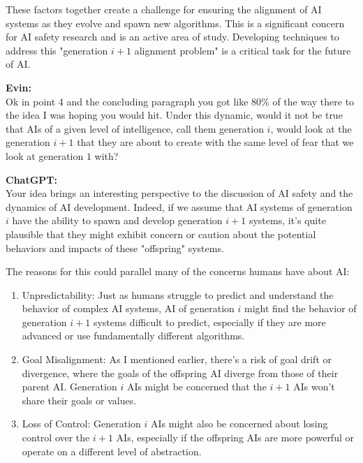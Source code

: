 \documentclass{article}[10pt]
\begin{document}
    These factors together create a challenge for ensuring the alignment of AI systems as they evolve and spawn new algorithms. 
    This is a significant concern for AI safety research and is an active area of study. 
    Developing techniques to address this "generation \(i + 1\) alignment problem" is a critical task for the future of AI.\par


\noindent \textbf{Evin:}\\
Ok in point 4 and the concluding paragraph you got like 80\% of the way there to the idea I was hoping you would hit. 
Under this dynamic, would it not be true that AIs of a given level of intelligence, call them generation $ i $, would look at the generation $ i + 1$ that they are about to create with the same level of fear that we look at generation $1$ with?\par


\noindent \textbf{ChatGPT:}\\
Your idea brings an interesting perspective to the discussion of AI safety and the dynamics of AI development. 
Indeed, if we assume that AI systems of generation \(i\) have the ability to spawn and develop generation \(i+1\) systems, it's quite plausible that they might exhibit concern or caution about the potential behaviors and impacts of these "offspring" systems.\par

The reasons for this could parallel many of the concerns humans have about AI:
\begin{enumerate}
    \item Unpredictability: Just as humans struggle to predict and understand the behavior of complex AI systems, AI of generation \(i\) might find the behavior of generation \(i+1\) systems difficult to predict, especially if they are more advanced or use fundamentally different algorithms.
    \item Goal Misalignment: As I mentioned earlier, there's a risk of goal drift or divergence, where the goals of the offspring AI diverge from those of their parent AI. Generation \(i\) AIs might be concerned that the \(i+1\) AIs won't share their goals or values.
    \item Loss of Control: Generation \(i\) AIs might also be concerned about losing control over the \(i+1\) AIs, especially if the offspring AIs are more powerful or operate on a different level of abstraction.
\end{enumerate}
\end{document}

